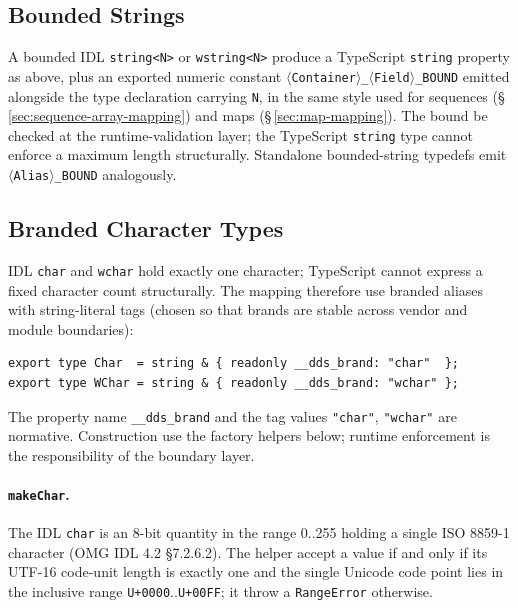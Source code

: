 \documentclass{../styles/zerodds-vendor-spec}
\begin{document}
\subsection{Bounded Strings}\label{sec:string-bound}

A bounded IDL \texttt{string<N>} or \texttt{wstring<N>}
 produce a TypeScript \texttt{string} property as
above, plus an exported numeric constant
\texttt{$\langle$Container$\rangle$\_$\langle$Field$\rangle$\_BOUND}
emitted alongside the type declaration carrying \texttt{N}, in
the same style used for sequences
(\S\,\ref{sec:sequence-array-mapping}) and maps
(\S\,\ref{sec:map-mapping}). The bound  be
checked at the runtime-validation layer; the TypeScript
\texttt{string} type cannot enforce a maximum length
structurally. Standalone bounded-string typedefs
 emit
\texttt{$\langle$Alias$\rangle$\_BOUND} analogously.

\subsection{Branded Character Types}\label{sec:char-brand}

IDL \texttt{char} and \texttt{wchar} hold exactly one character;
TypeScript cannot express a fixed character count structurally.
The mapping  therefore use branded aliases with
string-literal tags (chosen so that brands are stable across
vendor and module boundaries):

\begin{lstlisting}
export type Char  = string & { readonly __dds_brand: "char"  };
export type WChar = string & { readonly __dds_brand: "wchar" };
\end{lstlisting}

The property name \texttt{\_\_dds\_brand} and the tag values
\texttt{"char"}, \texttt{"wchar"} are normative. Construction
 use the factory helpers below; runtime enforcement
is the responsibility of the boundary layer.

\paragraph{\texttt{makeChar}.} The IDL \texttt{char} is an 8-bit
quantity in the range 0..255 holding a single ISO 8859-1 character
(OMG IDL 4.2 §7.2.6.2). The helper  accept a value if
and only if its UTF-16 code-unit length is exactly one and the
single Unicode code point lies in the inclusive range
\texttt{U+0000}..\texttt{U+00FF}; it  throw a
\texttt{RangeError} otherwise.
\end{document}
